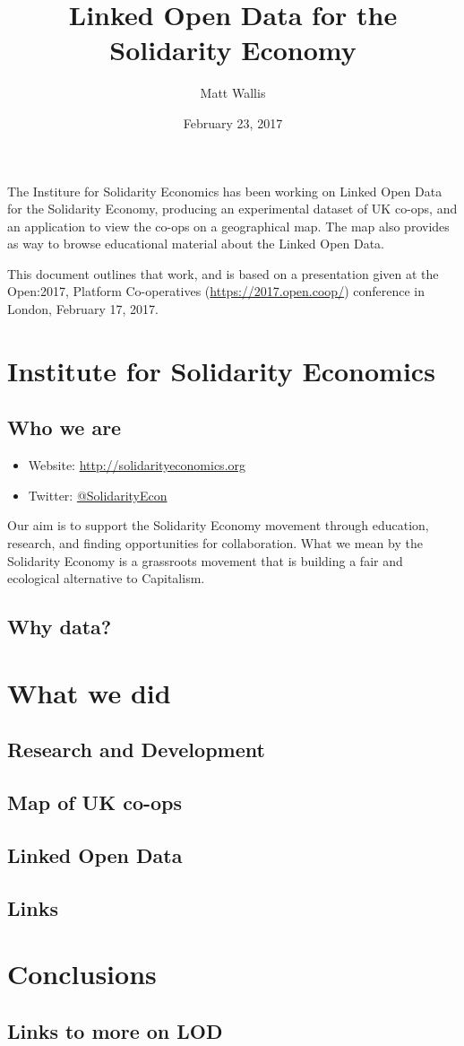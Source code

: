 \documentclass[11pt,twoside,a4paper]{article}
\title{Linked Open Data for the Solidarity Economy}
\author{Matt Wallis}
\date{February 23, 2017}
\begin{document}
\maketitle

The Institure for Solidarity Economics has been working on Linked Open Data for the Solidarity Economy,
producing an experimental dataset of UK co-ops, and an application to view the co-ops on a geographical map.
The map also provides as way to browse educational material about the Linked Open Data.

This document outlines that work, and is based on a presentation given at the Open:2017, Platform Co-operatives (\url{https://2017.open.coop/}) conference in London, February 17, 2017.

\section*{Institute for Solidarity Economics}
\subsection*{Who we are}
  \begin{itemize}
    \item Website: \url{http://solidarityeconomics.org}
    \item Twitter: \href{https://twitter.com/SolidarityEcon}{@SolidarityEcon}
  \end{itemize}
Our aim is to support the Solidarity Economy movement through education, research, and finding opportunities for collaboration.
What we mean by the Solidarity Economy is a grassroots movement that is building a fair and ecological alternative to Capitalism.

\subsection*{Why data?}
\section*{What we did}
\subsection*{Research and Development}
\subsection*{Map of UK co-ops}
\subsection*{Linked Open Data}
\subsection*{Links}
\section*{Conclusions}
\subsection*{Links to more on LOD}
\end{document}
